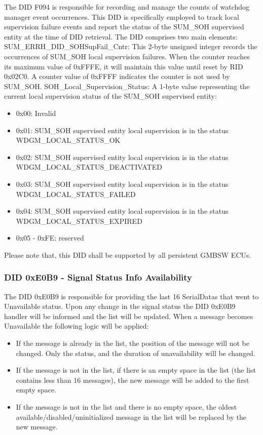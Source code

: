 The DID F094 is responsible for recording and manage the counts of watchdog manager event occurrences. This DID is specifically employed to track local supervision failure events and report the status of the SUM_SOH supervised entity at the time of DID retrieval. The DID comprises two main elements:
SUM_ERRH_DID_SOHSupFail_Cntr: This 2-byte unsigned integer records the occurrences of SUM_SOH local supervision failures. When the counter reaches its maximum value of 0xFFFE, it will maintain this value until reset by RID 0x02C0. A counter value of 0xFFFF indicates the counter is not used by SUM_SOH.
SOH_Local_Supervision_Status: A 1-byte value representing the current local supervision status of the SUM_SOH supervised entity:
\begin{itemize}
    \item 0x00: Invalid
    \item 0x01: SUM_SOH supervised entity local supervision is in the status WDGM_LOCAL_STATUS_OK
    \item 0x02: SUM_SOH supervised entity local supervision is in the status WDGM_LOCAL_STATUS_DEACTIVATED
    \item 0x03: SUM_SOH supervised entity local supervision is in the status WDGM_LOCAL_STATUS_FAILED
    \item 0x04: SUM_SOH supervised entity local supervision is in the status WDGM_LOCAL_STATUS_EXPIRED
    \item 0x05 - 0xFE: reserved
\end{itemize}

Please note that, this DID shall be supported by all persistent GMBSW ECUs.

{}

\subsubsection{DID 0xE0B9 - Signal Status Info Availability}
\label{sec:dyne0b9}

The DID 0xE0B9 is responsible for providing the last 16 SerialDatas that went to Unavailable status. Upon any change in the signal status 
the DID 0xE0B9 handler will be informed and the list will be updated. 
When a message becomes Unavailable the following logic will be applied:
\begin{itemize}
    \item If the message is already in the list, the position of the message will not be changed. Only the status, and the duration of unavailability will be changed.
    \item If the message is not in the list, if there is an empty space in the list (the list contains less than 16 messages), the new message will be added to the first empty space.
    \item If the message is not in the list and there is no empty space, the oldest available/disabled/uninitialized message in the list will be replaced by the new message.
\end{itemize}


